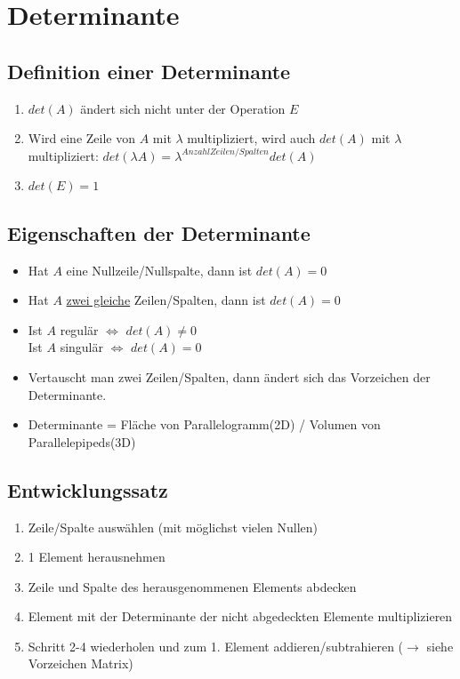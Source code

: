 \section{Determinante}

\subsection{Definition einer Determinante}
	\begin{enumerate}
		\item $det(A)$ ändert sich nicht unter der Operation $E$
		\item Wird eine Zeile von $A$ mit $\lambda$ multipliziert, wird auch $det(A)$ mit $\lambda$ multipliziert: $det(\lambda A)=\lambda^{Anzahl Zeilen/Spalten}det(A)$
		\item $det(E) = 1$
	\end{enumerate}

\subsection{Eigenschaften der Determinante}
	\begin{itemize}
		\item Hat $A$ eine Nullzeile/Nullspalte, dann ist $det(A) = 0$
		\item Hat $A$ \underline{zwei gleiche} Zeilen/Spalten, dann ist $det(A) = 0$
		\item Ist $A$ regulär $\Leftrightarrow$ $det(A) \neq 0$ \\
			Ist $A$ singulär $\Leftrightarrow$ $det(A) = 0$
		\item Vertauscht man zwei Zeilen/Spalten, dann ändert sich das Vorzeichen der Determinante.
		\item Determinante = Fläche von Parallelogramm(2D) / Volumen von Parallelepipeds(3D)
	\end{itemize}

\subsection{Entwicklungssatz}
	\begin{enumerate}
		\item Zeile/Spalte auswählen (mit möglichst vielen Nullen)
		\item 1 Element herausnehmen
		\item Zeile und Spalte des herausgenommenen Elements abdecken
		\item Element mit der Determinante der nicht abgedeckten Elemente multiplizieren
		\item Schritt 2-4 wiederholen und zum 1. Element addieren/subtrahieren ($\rightarrow$ siehe Vorzeichen Matrix)
	\end{enumerate}
	
